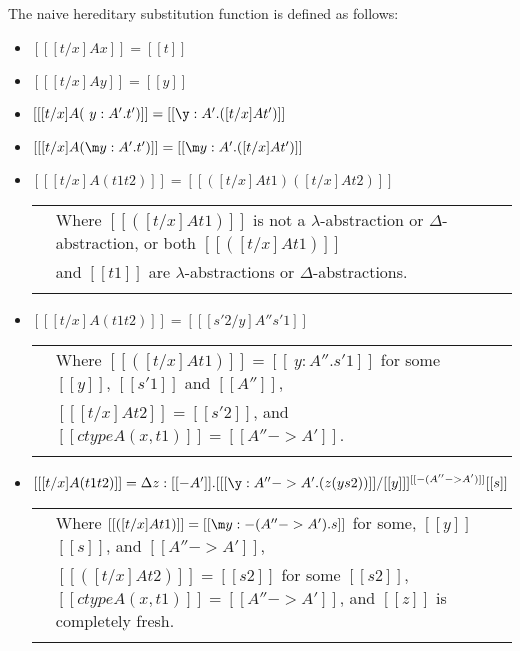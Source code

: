 \begin{definition}
  \label{def:hereditary_substitution_function}
  The naive hereditary substitution function is defined as follows:
  \small
  \begin{itemize}
  \item[] $[[ [t/x] A x]] = [[t]]$
  \item[] $[[ [t/x] A y]] = [[y]]$\\

  \item[] $[[ [t/x] A (\ y:A'.t')]] = [[\y:A'.([t/x ] A t')]]$
  \item[] $[[ [t/x] A (\m y:A'.t')]] = [[\m y:A'.([t/x] A t')]]$\\

  \item[] $[[ [t/x] A (t1 t2)]] = [[([t/x] A t1) ([t/x] A t2)]]$\\
    \begin{tabular}{lll}
      & Where $[[([t/x] A t1)]]$ is not a $\lambda$-abstraction or $\Delta$-abstraction,  or both $[[([t/x] A t1)]]$ \\
      & and  $[[t1]]$ are $\lambda$-abstractions or $\Delta$-abstractions.\\
      & \\
    \end{tabular}

  \item[] $[[ [t/x] A (t1 t2)]] = [[ [s'2/y] A'' s'1]]$\\
    \begin{tabular}{lll}
      & Where $[[([t/x] A t1)]] = [[\ y:A''.s'1]]$ for some $[[y]]$, $[[s'1]]$ and $[[A'']]$, \\
      & $[[ [t/x] A t2]] = [[s'2]]$, and $[[ctype A (x,t1)]] = [[A'' -> A']]$. \\
      & \\
    \end{tabular}

  \item[] $[[ [t/x] A (t1 t2)]] = \Delta z:[[{-A'}]].[ [[\y:A'' -> A'.(z (y s2))]]/[[y]] ]^{[[{-(A''->A')}]]} [[s]]$\\
    \begin{tabular}{lll}
      & Where $[[([t/x] A t1)]] = [[\m y:{-(A''->A')}.s]]$ for some, $[[y]]$ $[[s]]$, 
      and $[[A'' -> A']]$, \\      
      & $[[([t/x] A t2)]] = [[s2]]$ for some $[[s2]]$, $[[ctype A (x,t1)]] = [[A'' -> A']]$, and $[[z]]$ is completely fresh.\\
      & \\
    \end{tabular}  
  \end{itemize}
\end{definition}

